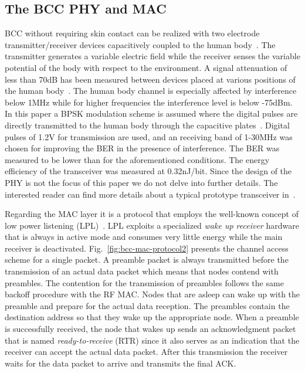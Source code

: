 \documentclass[10pt]{IEEEtran}
\newcounter{section:outage-analysis}
\begin{document}
\subsection{The BCC PHY and MAC}
BCC without requiring skin contact can be realized with two electrode transmitter/receiver devices capacitively coupled to the human body~\cite{baldus09}. The transmitter generates a variable electric field while the receiver senses the variable potential of the body with respect to the environment. A signal attenuation of less than 70dB has been measured between devices placed at various positions of the human body~\cite{schenk08}. The human body channel is especially affected by interference below 1MHz while for higher frequencies the interference level is below -75dBm. In this paper a BPSK modulation scheme is assumed where the digital pulses are directly transmitted to the human body through the capacitive plates~\cite{fazzi09}. Digital pulses of 1.2V for transmission are used, and an receiving band of 1-30MHz was chosen for improving the BER in the presence of interference. The BER was measured to be lower than  for the aforementioned conditions. The energy efficiency of the transceiver was measured at 0.32nJ/bit. Since the design of the PHY is not the focus of this paper we do not delve into further details. The interested reader can find more details about a typical prototype transceiver in~\cite{fazzi09}.

Regarding the MAC layer it is a protocol that employs the well-known concept of low power listening (LPL)~\cite{buettner06}. LPL exploits a specialized \textit{wake up receiver} hardware that is always in active mode and consumes very little energy while the main receiver is deactivated. Fig.~\ref{fig:bcc-mac-protocol2} presents the channel access scheme for a single packet. A preamble packet is always transmitted before the transmission of an actual data packet which means that nodes contend with preambles. The contention for the transmission of preambles follows the same backoff procedure with the RF MAC. Nodes that are asleep can wake up with the preamble and prepare for the actual data reception. The preambles contain the destination address so that they wake up the appropriate node. When a preamble is successfully received, the node that wakes up sends an acknowledgment packet that is named \emph{ready-to-receive} (RTR) since it also serves as an indication that the receiver can accept the actual data packet. After this transmission the receiver waits for the data packet to arrive and transmits the final ACK.
\end{document}
